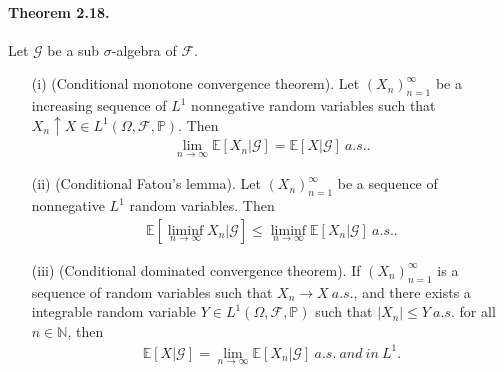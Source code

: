 \documentclass{article}
\numberwithin{equation}{section}
\newcommand{\E}{\mathbb{E}}
\renewcommand{\P}{\mathbb{P}}
\newcommand{\scr}{\mathscr}
\theoremstyle{plain}
\theoremstyle{definition}
\begin{document}
\paragraph{Theorem 2.18.\label{thm:2.18}} Let $\mathscr{G}$ be a sub $\sigma$-algebra of $\mathscr{F}$. 
\begin{itemize}
	\item[(i)] (Conditional monotone convergence theorem). Let $(X_n)_{n=1}^\infty$ be a increasing sequence of $L^1$ nonnegative random variables such that $X_n\uparrow X\in L^1(\Omega,\scr{F},\P)$. Then
	\begin{align*}
		\lim_{n\to\infty}\E[X_n|\scr{G}]=\E\left[X|\scr{G}\right]\ a.s..
	\end{align*}
	\item[(ii)] (Conditional Fatou's lemma). Let $(X_n)_{n=1}^\infty$ be a sequence of nonnegative $L^1$ random variables. Then
	\begin{align*}
		\E\left[\liminf_{n\to\infty} X_n\big|\mathscr{G}\right]\leq\liminf_{n\to\infty}\E[X_n|\mathscr{G}]\ a.s..
	\end{align*}
	\item[(iii)] (Conditional dominated convergence theorem). If $(X_n)_{n=1}^\infty$ is a sequence of random variables such that $X_n\to X\ a.s.$, and there exists a integrable random variable $Y\in L^1(\Omega,\mathscr{F},\P)$ such that $\vert X_n\vert\leq Y\ a.s.$ for all $n\in\mathbb{N}$, then
	\begin{align*}
		\E[X|\mathscr{G}]=\lim_{n\to\infty}\E[X_n|\mathscr{G}]\ a.s.\ and\ in\ L^1.
	\end{align*}
\end{itemize}
\end{document}
